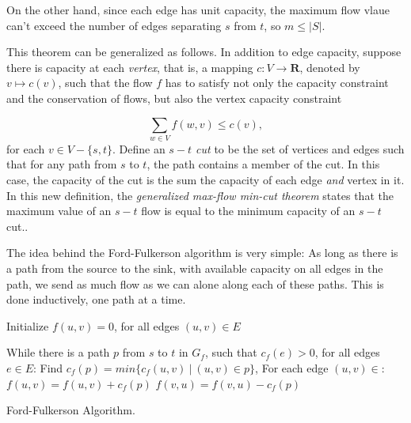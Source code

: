 On the other hand, since each edge has unit capacity,
the maximum flow vlaue can't exceed the number of 
edges separating $s$ from $t$, so $m\leq |S|$.


\begin{remark}
\label{remark:GMCMF}
{\rm
This theorem can be generalized as follows.
In addition to edge capacity, suppose there is capacity at each {\it vertex}, 
that is, a mapping $c: V\to {\mathbf{R}}$, denoted by 
$v\longmapsto c(v)$, such that the flow $f$ has to 
satisfy not only the capacity constraint and the conservation of flows, 
but also the vertex capacity constraint

\[
 \sum_{w\in V} f(w,v) \leq c(v), 
\]
for each $v \in V-\{s,t\}$.
Define an {\it $s-t$ cut} to be the set of vertices and edges such 
that for any path from $s$ to $t$, the path contains a member of the cut. 
In this case, the capacity of the cut is the sum the capacity of each 
edge {\it and} vertex in it.
In this new definition, the {\it generalized max-flow min-cut theorem}
states that the maximum value of an $s-t$ flow is equal to the minimum 
capacity of an $s-t$ cut..
}
\end{remark}

The idea behind the Ford-Fulkerson algorithm is very simple: As long as 
there is a path from the source to the sink, with 
available capacity on all edges in the 
path, we send as much flow as we can alone along each 
of these paths. This is done inductively, one path at a time.


\begin{algorithm}[!htpb]
\dontprintsemicolon  %

\BlankLine
Initialize $f(u,v)=0$, for all edges $(u,v)\in E$\;

While there is a path $p$ from $s$ to $t$ in $G_f$, such that
$c_f(e) > 0$, for all edges $e\in E$:\;
\quad       Find $c_f(p) = min\{ c_f(u,v)\ |\ (u,v) \in p\}$,\;
\quad       For each edge $(u,v) \in $:\;
\quad   \quad        $f(u,v) = f(u,v) + c_f(p)$\;
\quad   \quad        $f(v,u) = f(v,u) - c_f(p)$\;
\caption{Ford-Fulkerson Algorithm.}
\label{alg:distance-connectivity:ford-fulkerson}
\end{algorithm}

